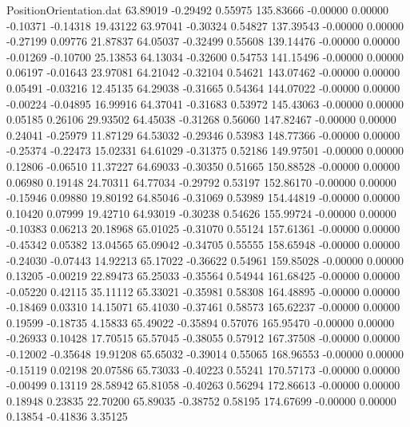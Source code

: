 \begin{filecontents}{PositionOrientation.dat}
  63.89019   -0.29492    0.55975   135.83666   -0.00000    0.00000   -0.10371   -0.14318   19.43122
  63.97041   -0.30324    0.54827   137.39543   -0.00000    0.00000   -0.27199    0.09776   21.87837
  64.05037   -0.32499    0.55608   139.14476   -0.00000    0.00000   -0.01269   -0.10700   25.13853
  64.13034   -0.32600    0.54753   141.15496   -0.00000    0.00000    0.06197   -0.01643   23.97081
  64.21042   -0.32104    0.54621   143.07462   -0.00000    0.00000    0.05491   -0.03216   12.45135
  64.29038   -0.31665    0.54364   144.07022   -0.00000    0.00000   -0.00224   -0.04895   16.99916
  64.37041   -0.31683    0.53972   145.43063   -0.00000    0.00000    0.05185    0.26106   29.93502
  64.45038   -0.31268    0.56060   147.82467   -0.00000    0.00000    0.24041   -0.25979   11.87129
  64.53032   -0.29346    0.53983   148.77366   -0.00000    0.00000   -0.25374   -0.22473   15.02331
  64.61029   -0.31375    0.52186   149.97501   -0.00000    0.00000    0.12806   -0.06510   11.37227
  64.69033   -0.30350    0.51665   150.88528   -0.00000    0.00000    0.06980    0.19148   24.70311
  64.77034   -0.29792    0.53197   152.86170   -0.00000    0.00000   -0.15946    0.09880   19.80192
  64.85046   -0.31069    0.53989   154.44819   -0.00000    0.00000    0.10420    0.07999   19.42710
  64.93019   -0.30238    0.54626   155.99724   -0.00000    0.00000   -0.10383    0.06213   20.18968
  65.01025   -0.31070    0.55124   157.61361   -0.00000    0.00000   -0.45342    0.05382   13.04565
  65.09042   -0.34705    0.55555   158.65948   -0.00000    0.00000   -0.24030   -0.07443   14.92213
  65.17022   -0.36622    0.54961   159.85028   -0.00000    0.00000    0.13205   -0.00219   22.89473
  65.25033   -0.35564    0.54944   161.68425   -0.00000    0.00000   -0.05220    0.42115   35.11112
  65.33021   -0.35981    0.58308   164.48895   -0.00000    0.00000   -0.18469    0.03310   14.15071
  65.41030   -0.37461    0.58573   165.62237   -0.00000    0.00000    0.19599   -0.18735    4.15833
  65.49022   -0.35894    0.57076   165.95470   -0.00000    0.00000   -0.26933    0.10428   17.70515
  65.57045   -0.38055    0.57912   167.37508   -0.00000    0.00000   -0.12002   -0.35648   19.91208
  65.65032   -0.39014    0.55065   168.96553   -0.00000    0.00000   -0.15119    0.02198   20.07586
  65.73033   -0.40223    0.55241   170.57173   -0.00000    0.00000   -0.00499    0.13119   28.58942
  65.81058   -0.40263    0.56294   172.86613   -0.00000    0.00000    0.18948    0.23835   22.70200
  65.89035   -0.38752    0.58195   174.67699   -0.00000    0.00000    0.13854   -0.41836    3.35125

\end{filecontents}
